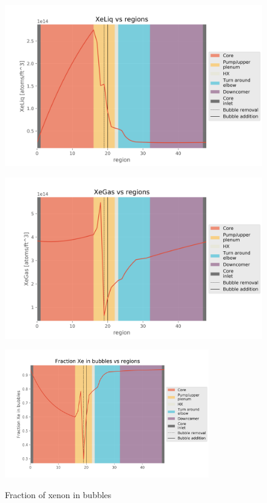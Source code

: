 \begin{figure}[ht] 
\centering
\begin{minipage}{.5\textwidth}
  \centering
  \includegraphics[width=1.0\linewidth]{images/BaseCaseXeLiq.png}
  \label{fig:BaseCaseXeLiq}
\end{minipage}%
\begin{minipage}{.5\textwidth}
  \centering
  \includegraphics[width=1.0\linewidth]{images/BaseCaseXeGas.png}
  \label{fig:BaseCaseXeGas}
\end{minipage}
\end{figure}

\begin{figure}[ht]
  \centering
  \includegraphics[width=3.5in]{images/BaseCaseFractionXeInBubbles.png}\\
  \caption{Fraction of xenon in bubbles}
  \label{fig:BaseCaseXePercent}
\end{figure}

